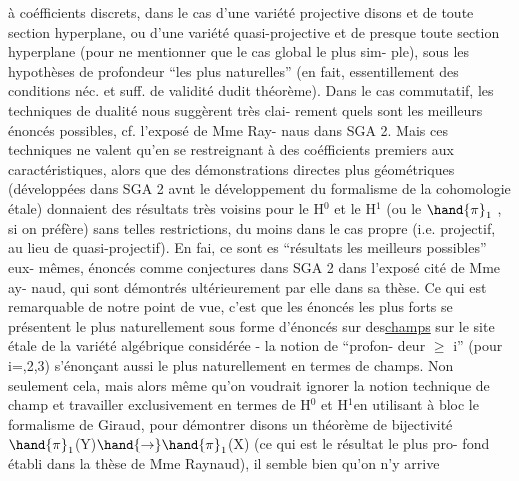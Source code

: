 
à coéfficients discrets\hand{(}, dans le cas d'une variété projective disons et
de toute section hyperplane, ou d'une variété quasi-projective et de presque
toute section hyperplane (pour ne mentionner que le cas global le plus sim-%
ple), sous les hypothèses de profondeur\hand{(} ``les plus naturelles'' (en fait,
essentillement des conditions néc. et suff. de validité dudit théorème).
Dans le cas commutatif, les techniques de dualité nous suggèrent très clai-%
rement quels sont les meilleurs énoncés possibles, cf. l'exposé de Mme Ray-%
naus dans SGA 2. Mais ces techniques ne valent qu'en se restreignant à des
coéfficients premiers aux caractéristiques, alors que des démonstrations
directes plus géométriques (développées dans SGA 2 avnt le développement
du formalisme de la cohomologie étale) donnaient des résultats très voisins
pour le H$^0$ et le H$^1$ (ou le $\hand{\pi}_1$ , si on préfère) sans telles restrictions,
du moins dans le cas propre (i.e. projectif, au lieu de quasi-projectif).
En fai, ce sont  es ``résultats les meilleurs possibles'' eux-%
mêmes, énoncés comme conjectures dans SGA 2 dans l'exposé cité de Mme ay-%
naud, qui sont démontrés ultérieurement par elle dans sa thèse. Ce qui est
remarquable de notre point de vue, c'est que les énoncés les plus forts se
présentent le plus naturellement sous forme d'énoncés sur des\uline{champs} sur
le site étale de la variété algébrique considérée - la notion de ``profon-%
deur $\geq$ i'' (pour i=,2,3) s'énonçant aussi le plus naturellement en termes
de champs. Non seulement cela, mais alors même qu'on voudrait ignorer la
notion technique de champ et travailler exclusivement en termes de H$^0$ et
H$^1$en utilisant à bloc le formalisme de Giraud, pour démontrer disons un
théorème de bijectivité $\hand{\pi}_1$(Y)$\hand{\to}\hand{\pi}_1$(X) (ce qui est le résultat le plus pro-%
fond établi dans la thèse de Mme Raynaud), il semble bien qu'on n'y arrive
